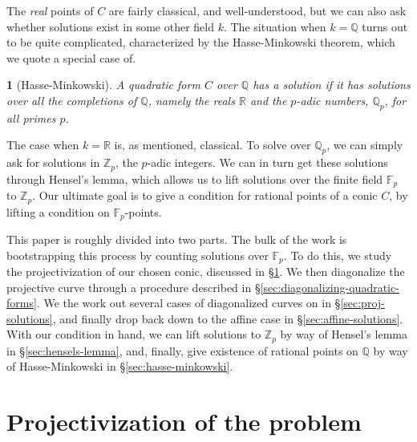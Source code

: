 \documentclass[10pt,a4paper]{amsart}
\numberwithin{equation}{section}
\numberwithin{figure}{section}
\theoremstyle{definition}
\theoremstyle{remark}
\theoremstyle{plain}
\newtheorem{thm}{\protect\theoremname}[section]
\theoremstyle{plain}
\theoremstyle{definition}
\theoremstyle{plain}
\theoremstyle{plain}
\providecommand{\theoremname}{Theorem}
\newcommand{\F}{\mathbb{F}}
\newcommand{\Z}{\mathbb{Z}}
\newcommand{\Q}{\mathbb{Q}}
\newcommand{\R}{\mathbb{R}}
\begin{document}
	The \emph{real} points of $C$ are fairly classical, and well-understood,
	but we can also ask whether solutions exist in some other
	field $k$. The situation when $k=\Q$ turns out to be quite complicated,
	characterized by the Hasse-Minkowski theorem, which we quote a special
	case of.
	\begin{thm}[Hasse-Minkowski]
		A quadratic form $C$ over $\Q$ has a solution if it has solutions
		over all the completions of $\Q$, namely the reals $\R$ and the $p$-adic
		numbers, $\Q_p$, for all primes $p$.
	\end{thm}
	The case when $k = \R$ is, as mentioned, classical. To solve over $\Q_p$,
	we can simply ask for solutions in $\Z_p$, the $p$-adic integers. We
	can in turn get these solutions through Hensel's lemma, which allows us
	to lift solutions over the finite field $\F_p$ to $\Z_p$. Our ultimate
	goal is to give a condition for rational points of a conic $C$, by lifting
	a condition on $\F_p$-points.
	
	This paper is roughly divided into two parts. The bulk of the work 
	is bootstrapping this process by counting solutions over $\F_p$. To do this,
	we study the projectivization of our chosen conic, discussed in
	\S\ref{sec:projectivization-of-the-problem}. We  then diagonalize 
	the projective curve through a procedure described in 
	\S\ref{sec:diagonalizing-quadratic-forms}. We the work out several cases
	of diagonalized curves on in \S\ref{sec:proj-solutions}, and finally
	drop back down to the affine case in \S\ref{sec:affine-solutions}.
	With our condition in hand, we can lift solutions to $\Z_p$ by way of
	Hensel's lemma in \S\ref{sec:hensels-lemma}, and, finally, give 
	existence of rational points on $\Q$ by way of Hasse-Minkowski in 
	\S\ref{sec:hasse-minkowski}.
    
    \section{Projectivization of the problem}\label{sec:projectivization-of-the-problem}
\end{document}
